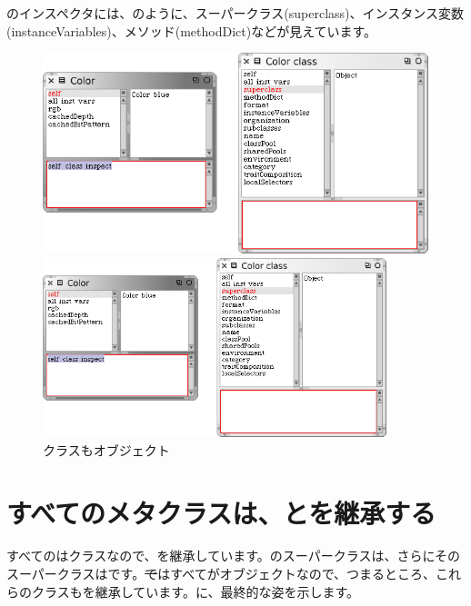 \documentclass[a4paper,10pt,twoside]{book}
\begin{document}
のインスペクタには、のように、スーパークラス(superclass)、インスタンス変数(instanceVariables)、メソッド(methodDict)などが見えています。

\begin{center}
\begin{figure}[!ht]
\ifluluelse
	{\centerline{\includegraphics[width=\textwidth]{InspectingColor}}}
	{\centerline{\includegraphics[width=10cm]{InspectingColor}}}
\caption{クラスもオブジェクト}
\end{figure}
\end{center}

\section{すべてのメタクラスは、とを継承する}

すべてのはクラスなので、を継承しています。のスーパークラスは、さらにそのスーパークラスはです。\st ではすべてがオブジェクトなので、つまるところ、これらのクラスもを継承しています。に、最終的な姿を示します。
\end{document}
